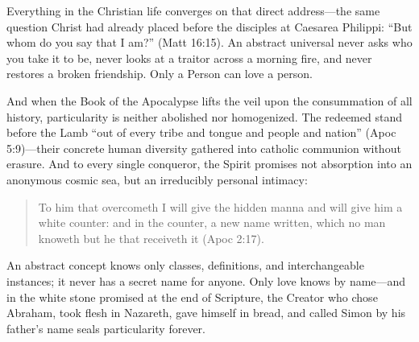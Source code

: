 Everything in the Christian life converges on that direct address---the same question Christ had already placed before the disciples at Caesarea Philippi: ``But whom do you say that I am?'' (Matt 16:15). An abstract universal never asks who you take it to be, never looks at a traitor across a morning fire, and never restores a broken friendship. Only a Person can love a person.

And when the Book of the Apocalypse lifts the veil upon the consummation of all history, particularity is neither abolished nor homogenized. The redeemed stand before the Lamb ``out of every tribe and tongue and people and nation'' (Apoc 5:9)---their concrete human diversity gathered into catholic communion without erasure. And to every single conqueror, the Spirit promises not absorption into an anonymous cosmic sea, but an irreducibly personal intimacy:

\begin{quote}
To him that overcometh I will give the hidden manna and will give him a white counter: and in the counter, a new name written, which no man knoweth but he that receiveth it (Apoc 2:17).
\end{quote}

An abstract concept knows only classes, definitions, and interchangeable instances; it never has a secret name for anyone. Only love knows by name---and in the white stone promised at the end of Scripture, the Creator who chose Abraham, took flesh in Nazareth, gave himself in bread, and called Simon by his father's name seals particularity forever.

